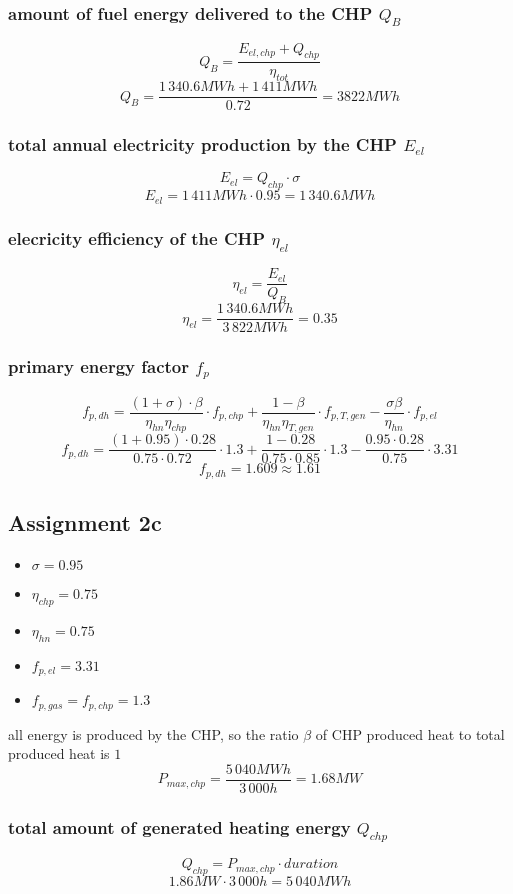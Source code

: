 \documentclass{article}
\begin{document}
		\subsubsection*{amount of fuel energy delivered to the CHP $Q_B$}
			$$Q_B=\frac{E_{el,chp}+Q_{chp}}{\eta_{tot}}$$
			$$Q_B=\frac{1\,340.6MWh+1\,411MWh}{0.72}=3822MWh$$
		\subsubsection*{total annual electricity production by the CHP $E_{el}$}
			$$E_{el}=Q_{chp}\cdot \sigma$$
			$$E_{el}=1\,411MWh\cdot 0.95 = 1\,340.6MWh$$
		\subsubsection*{elecricity efficiency of the CHP $\eta_{el}$}
			$$\eta_{el}=\frac{E_{el}}{Q_B}$$
			$$\eta_{el}=\frac{1\,340.6MWh}{3\,822MWh}=0.35$$
		\subsubsection*{primary energy factor $f_p$}
			$$f_{p,dh}=\frac{(1+\sigma)\cdot\beta}{\eta_{hn}\eta_{chp}}\cdot f_{p,chp}+\frac{1-\beta}{\eta_{hn}\eta_{T,gen}}\cdot f_{p,T,gen}-\frac{\sigma\beta}{\eta_{hn}}\cdot f_{p,el}$$
			$$f_{p,dh}=\frac{(1+0.95)\cdot 0.28}{0.75\cdot 0.72}\cdot 1.3+\frac{1-0.28}{0.75\cdot 0.85}\cdot 1.3-\frac{0.95\cdot 0.28}{0.75}\cdot 3.31$$
			$$f_{p,dh}=1.609\approx 1.61$$

	\newpage
	\subsection*{Assignment 2c}
		\begin{itemize}
			\item $\sigma=0.95$
			\item $\eta_{chp}=0.75$
			\item $\eta_{hn}=0.75$
			\item $f_{p,el}=3.31$
			\item $f_{p,gas}=f_{p,chp}=1.3$
		\end{itemize}

		all energy is produced by the CHP, so the ratio $\beta$ of CHP produced heat to total produced heat is $1$
		$$P_{max,chp}=\frac{5\,040MWh}{3\,000h}=1.68MW$$

		\subsubsection*{total amount of generated heating energy $Q_{chp}$}
			$$Q_{chp}=P_{max,chp}\cdot duration$$
			$$1.86MW\cdot 3\,000h=5\,040MWh$$
\end{document}
